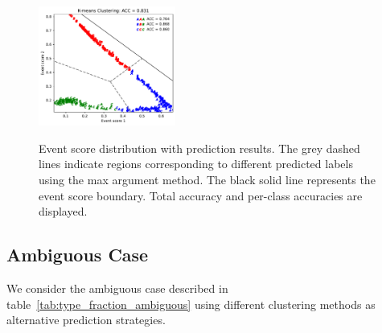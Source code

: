 \documentclass[12pt]{article}
\begin{document}
\begin{figure}[htpb]
{                \includegraphics[width=0.40\textwidth]{multi-class_testing_data_predict-dominated_1-kmeans.pdf}  
            } \\  
            \caption{Event score distribution with prediction results. The grey dashed lines indicate regions corresponding to different predicted labels using the max argument method. The black solid line represents the event score boundary. Total accuracy and per-class accuracies are displayed.}  
            \label{fig:event_score_distribution_w_prediction_dominated_1_train_test_comparison}  
        \end{figure}  
    \subsection{Ambiguous Case}%
    \label{sub:ambiguous_case_train_test_comparison}
        We consider the ambiguous case described in table~\ref{tab:type_fraction_ambiguous} using different clustering methods as alternative prediction strategies.  
\end{document}
